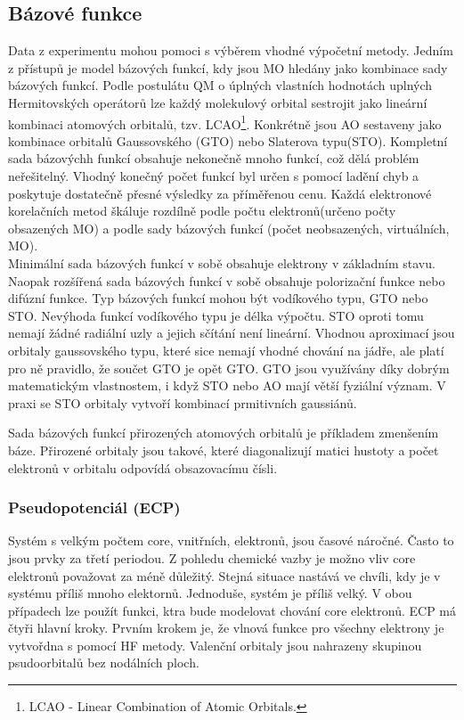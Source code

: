 \documentclass[
  digital, %
  table,   %
  lof,     %
  lot,     %
]{fithesis3}
\begin{document}
\subsection{Bázové funkce}
Data z experimentu mohou pomoci s výběrem vhodné výpočetní metody. Jedním z přístupů je model bázových funkcí, kdy jsou MO hledány jako kombinace sady bázových funkcí. Podle postulátu QM o úplných vlastních hodnotách uplných Hermitovských operátorů lze každý molekulový orbital sestrojit jako lineární kombinaci atomových orbitalů, tzv. LCAO\footnote{LCAO - Linear Combination of Atomic Orbitals.}. Konkrétně jsou AO sestaveny jako kombinace orbitalů Gaussovského (GTO) nebo Slaterova typu(STO).
Kompletní sada bázovýchh funkcí obsahuje nekonečně mnoho funkcí, což dělá problém neřešitelný. Vhodný konečný počet funkcí byl určen s pomocí ladění chyb a poskytuje dostatečně přesné výsledky za příměřenou cenu. Každá elektronové korelačních metod škáluje rozdílně podle počtu elektronů(určeno počty obsazených MO) a podle sady bázových funkcí (počet neobsazených, virtuálních, MO).\\
Minimální sada bázových funkcí v sobě obsahuje elektrony v základním stavu. Naopak rozšířená sada bázových funkcí v sobě obsahuje polorizační funkce nebo difúzní funkce. Typ bázových funkcí mohou být vodíkového typu, GTO nebo STO. Nevýhoda funkcí vodíkového typu je délka výpočtu. STO oproti tomu nemají žádné radiální uzly a jejich sčítání není lineární. Vhodnou aproximací jsou orbitaly gaussovského typu, které sice nemají vhodné chování na jádře, ale platí pro ně pravidlo, že součet GTO je opět GTO.\cite{lowe2011quantum} GTO jsou využívány díky dobrým matematickým vlastnostem, i když STO nebo AO mají větší fyziální význam. V praxi se STO orbitaly vytvoří kombinací prmitivních gaussiánů.

Sada bázových funkcí přirozených atomových orbitalů je příkladem zmenšením báze. Přirozené orbitaly jsou takové, které diagonalizují matici hustoty a počet elektronů v orbitalu odpovídá obsazovacímu čísli.

\subsubsection{Pseudopotenciál (ECP)}
Systém s velkým počtem core, vnitřních, elektronů, jsou časové náročné. Často to jsou prvky za třetí periodou. Z pohledu chemické vazby je možno vliv core elektronů považovat za méně důležitý. Stejná situace nastává ve chvíli, kdy je v systému příliš mnoho elektornů. Jednoduše, systém je příliš velký. V obou případech lze použít funkci, ktra bude modelovat chování core elektronů. ECP má čtyři hlavní kroky. Prvním krokem je, že vlnová funkce pro všechny elektrony je vytvořdna s pomocí HF metody. Valenční orbitaly jsou nahrazeny skupinou psudoorbitalů bez nodálních ploch.
\end{document}
